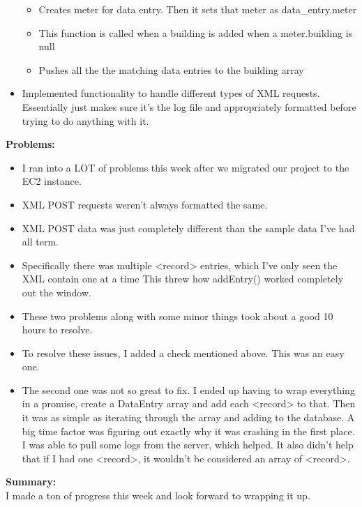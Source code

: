 \begin{adjustwidth}{2.5em}{0pt}
\begin{itemize}
	 \begin{itemize}
		\item Creates meter for data entry. Then it sets that meter as data_entry.meter
		\item This function is called when a building is added when a meter.building is null
		\item Pushes all the the matching data entries to the building array 
	 \end{itemize} 
	 \item Implemented functionality to handle different types of XML requests. Essentially just makes sure it's the log file and appropriately formatted before trying to do anything with it. 
	\end{itemize} 
    \vspace{-0.3cm}\textbf{Problems:}
    \vspace{-0.5cm}
    \begin{itemize}
        \item I ran into a LOT of problems this week after we migrated our project to the EC2 instance.  
		\item XML POST requests weren't always formatted the same. 
		\item XML POST data was just completely different than the sample data I've had all term. 
		\item Specifically there was multiple <record> entries, which I've only seen the XML contain one at a time This threw how addEntry() worked completely out the window. 
		\item These two problems along with some minor things took about a good 10 hours to resolve. 
		\item To resolve these issues, I added a check mentioned above. This was an easy one. 
		\item The second one was not so great to fix. I ended up having to wrap everything in a promise, create a DataEntry array and add each <record> to that. Then it was as simple as iterating through the array and adding to the database. A big time factor was figuring out exactly why it was crashing in the first place. I was able to pull some logs from the server, which helped. It also didn't help that if I had one <record>, it wouldn't be considered an array of <record>. 
    \end{itemize}  
    \vspace{-0.3cm}\noindent\textbf{Summary:}\\
    \noindent I made a ton of progress this week and look forward to wrapping it up.
\end{adjustwidth} 
